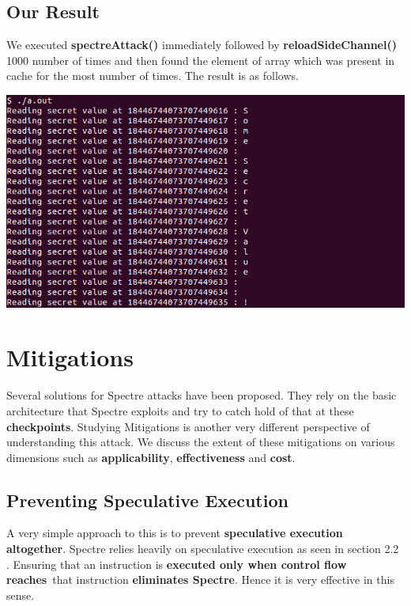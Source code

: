 \documentclass[12pt]{article}
\begin{document}
  
\subsection{Our Result}

We executed \textbf{spectreAttack()} immediately followed by \textbf{reloadSideChannel()} 1000 number of times and then found the element of array which was present in cache for the most number of times. The result is as follows.

\vspace*{0.5 cm}
	{\centering
    \vspace*{0.5 cm}
\includegraphics[scale = 0.6]{spectre.png}\\[1.0 cm]}


\newpage
\section{Mitigations\cite{Kocher2018spectre}}
Several solutions for Spectre attacks have been proposed. They rely on the basic architecture that Spectre exploits and try to catch hold of that at these \textbf{checkpoints}. Studying Mitigations is another very different perspective of understanding this attack. We discuss the extent of these mitigations on various dimensions such as \textbf{applicability}, \textbf{effectiveness} and \textbf{cost}.
\subsection{Preventing Speculative Execution}
A very simple approach to this is to prevent \textbf{speculative execution altogether}. Spectre relies heavily on speculative execution as seen in section 2.2 . Ensuring that an instruction is \textbf{executed only when control flow reaches}\ that instruction \textbf{eliminates Spectre}. Hence it is very effective in this sense.\\
\end{document}
